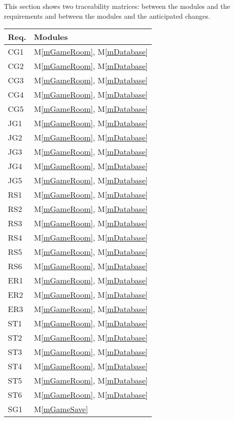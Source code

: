 \documentclass[12pt, titlepage]{article}
\newcommand{\mref}[1]{M\ref{#1}}
\begin{document}
This section shows two traceability matrices: between the modules and the
requirements and between the modules and the anticipated changes.

\begin{table}[H]
\centering
\begin{tabular}{p{} p{}}
\toprule
\textbf{Req.} & \textbf{Modules}\\
\midrule
CG1 & \mref{mGameRoom}, \mref{mDatabase}\\
CG2 & \mref{mGameRoom}, \mref{mDatabase}\\
CG3 & \mref{mGameRoom}, \mref{mDatabase}\\
CG4 & \mref{mGameRoom}, \mref{mDatabase}\\
CG5 & \mref{mGameRoom}, \mref{mDatabase}\\
JG1 & \mref{mGameRoom}, \mref{mDatabase}\\
JG2 & \mref{mGameRoom}, \mref{mDatabase}\\
JG3 & \mref{mGameRoom}, \mref{mDatabase}\\
JG4 & \mref{mGameRoom}, \mref{mDatabase}\\
JG5 & \mref{mGameRoom}, \mref{mDatabase}\\
RS1 & \mref{mGameRoom}, \mref{mDatabase}\\
RS2 & \mref{mGameRoom}, \mref{mDatabase}\\
RS3 & \mref{mGameRoom}, \mref{mDatabase}\\
RS4 & \mref{mGameRoom}, \mref{mDatabase}\\
RS5 & \mref{mGameRoom}, \mref{mDatabase}\\
RS6 & \mref{mGameRoom}, \mref{mDatabase}\\
ER1 & \mref{mGameRoom}, \mref{mDatabase}\\
ER2 & \mref{mGameRoom}, \mref{mDatabase}\\
ER3 & \mref{mGameRoom}, \mref{mDatabase}\\
ST1 & \mref{mGameRoom}, \mref{mDatabase}\\
ST2 & \mref{mGameRoom}, \mref{mDatabase}\\
ST3 & \mref{mGameRoom}, \mref{mDatabase}\\
ST4 & \mref{mGameRoom}, \mref{mDatabase}\\
ST5 & \mref{mGameRoom}, \mref{mDatabase}\\
ST6 & \mref{mGameRoom}, \mref{mDatabase}\\
SG1 & \mref{mGameSave}\\

\end{tabular}
\end{table}
\end{document}
